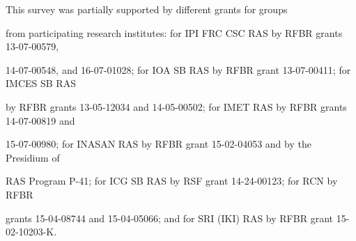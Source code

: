 


















\Ack


\noindent


This survey was partially supported by different grants for groups 


from participating research institutes: for IPI FRC CSC RAS by RFBR grants 13-07-00579, 


14-07-00548, and 16-07-01028; for IOA SB RAS by RFBR grant 13-07-00411; for IMCES SB RAS 


by RFBR grants 13-05-12034 and 14-05-00502; for IMET RAS by RFBR grants 14-07-00819 and 


15-07-00980; for INASAN RAS by RFBR grant 15-02-04053 and by the Presidium of 


RAS Program  P-41; for ICG SB RAS  by RSF grant 14-24-00123; for RCN by RFBR 


grants 15-04-08744 and 15-04-05066; and for SRI (IKI) RAS by RFBR grant 15-02-10203-K. 













